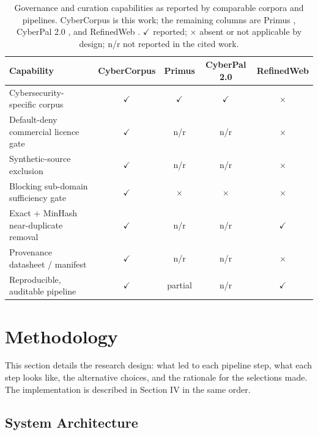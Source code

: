 \documentclass[conference]{IEEEtran}
\begin{document}
\begin{table}[t]
\caption{Governance and curation capabilities as reported by comparable corpora and pipelines. CyberCorpus is this work; the remaining columns are Primus \cite{yu2025primus}, CyberPal 2.0 \cite{levi2025cyberpal}, and RefinedWeb \cite{penedo2023refinedweb}. $\checkmark$ reported; $\times$ absent or not applicable by design; n/r not reported in the cited work.}
\label{tab:comparison}
\centering
\renewcommand{\arraystretch}{1.25}
\begin{tabular}{|l|c|c|c|c|}
\hline
\textbf{Capability} & \textbf{CyberCorpus} & \textbf{Primus} & \textbf{CyberPal 2.0} & \textbf{RefinedWeb} \\ \hline
Cybersecurity-specific corpus          & $\checkmark$ & $\checkmark$ & $\checkmark$ & $\times$     \\ \hline
Default-deny commercial licence gate   & $\checkmark$ & n/r          & n/r          & $\times$     \\ \hline
Synthetic-source exclusion             & $\checkmark$ & n/r          & n/r          & $\times$     \\ \hline
Blocking sub-domain sufficiency gate   & $\checkmark$ & $\times$     & $\times$     & $\times$     \\ \hline
Exact + MinHash near-duplicate removal & $\checkmark$ & n/r          & n/r          & $\checkmark$ \\ \hline
Provenance datasheet / manifest        & $\checkmark$ & n/r          & n/r          & $\times$     \\ \hline
Reproducible, auditable pipeline       & $\checkmark$ & partial      & n/r          & $\checkmark$ \\ \hline
\end{tabular}
\end{table}

\section{Methodology}

This section details the research design: what led to each pipeline step, what each step looks like, the alternative choices, and the rationale for the selections made. The implementation is described in Section IV in the same order.

\subsection{System Architecture}
\end{document}
